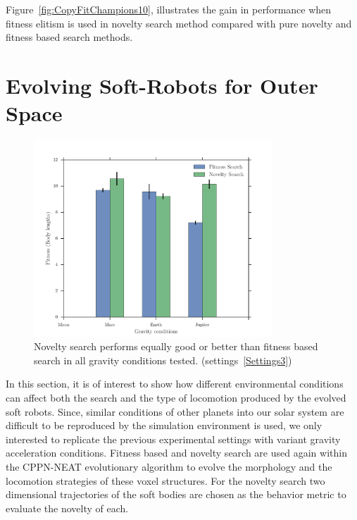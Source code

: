 Figure~\ref{fig:CopyFitChampions10}, illustrates the gain in performance when fitness elitism is used in novelty search method compared with pure novelty and fitness based search methods.



\section{Evolving Soft-Robots for Outer Space}  

\begin{figure}[t!]
\centering
\includegraphics[width=0.8\textwidth]{../Figures/Results/a.pdf}
\caption{Novelty search performs equally good or better than fitness based search in all gravity conditions tested. (settings~\ref{Settings3})} 
\label{fig:gravityConditions}
\end{figure}

In this section, it is of interest to show how different environmental conditions can affect both the search and the type of locomotion produced by the evolved soft robots. Since, similar conditions of other planets into our solar system are difficult to be reproduced by the simulation environment is used, we only interested to replicate the previous experimental settings with variant gravity acceleration conditions. Fitness based and novelty search are used again within the CPPN-NEAT evolutionary algorithm to evolve the morphology and the locomotion strategies of these voxel structures. For the novelty search two dimensional trajectories of the soft bodies are chosen as the behavior metric to evaluate the novelty of each. 

